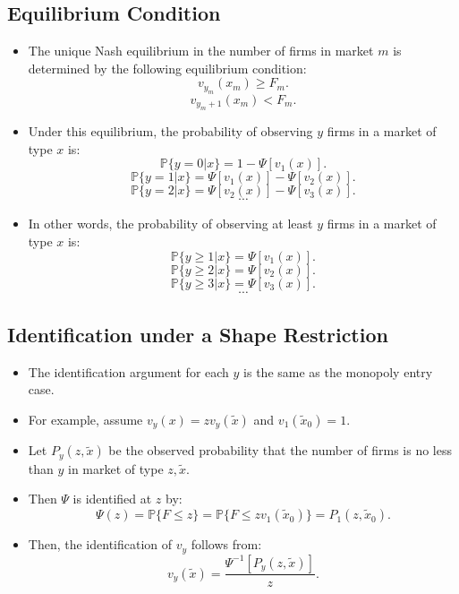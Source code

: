 \documentclass[
]{book}
\providecommand{\tightlist}{%
  \setlength{\itemsep}{0pt}\setlength{\parskip}{0pt}}
\begin{document}
\hypertarget{equilibrium-condition}{%
\subsection{Equilibrium Condition}\label{equilibrium-condition}}

\begin{itemize}
\item
  The unique Nash equilibrium in the number of firms in market \(m\) is determined by the following equilibrium condition:
  \[
  v_{y_m}(x_m) \ge F_m.
  \]
  \[
  v_{y_m + 1}(x_m) < F_m.
  \]
\item
  Under this equilibrium, the probability of observing \(y\) firms in a market of type \(x\) is:
  \[
  \mathbb{P}\{y = 0|x\} = 1 - \Psi[v_1(x)].
  \]
  \[
  \mathbb{P}\{y = 1|x\} = \Psi[v_1(x)] - \Psi[v_2(x)].
  \]
  \[
  \mathbb{P}\{y = 2|x\} = \Psi[v_2(x)] - \Psi[v_3(x)].
  \]
  \[
  \cdots
  \]
\item
  In other words, the probability of observing at least \(y\) firms in a market of type \(x\) is:
  \[
  \mathbb{P}\{y \ge 1|x\} = \Psi[v_1(x)].
  \]
  \[
  \mathbb{P}\{y \ge 2|x\} = \Psi[v_2(x)].
  \]
  \[
  \mathbb{P}\{y \ge 3|x\} = \Psi[v_3(x)].
  \]
  \[
  \cdots
  \]
\end{itemize}

\hypertarget{identification-under-a-shape-restriction}{%
\subsection{Identification under a Shape Restriction}\label{identification-under-a-shape-restriction}}

\begin{itemize}
\tightlist
\item
  The identification argument for each \(y\) is the same as the monopoly entry case.
\item
  For example, assume \(v_y(x) = z v_y(\tilde{x})\) and \(v_1(\tilde{x}_0) = 1\).
\item
  Let \(P_y(z, \tilde{x})\) be the observed probability that the number of firms is no less than \(y\) in market of type \(z, \tilde{x}\).
\item
  Then \(\Psi\) is identified at \(z\) by:
  \[
  \Psi(z) = \mathbb{P}\{F \le z\} = \mathbb{P}\{F \le z v_1(\tilde{x}_0)\} = P_1(z, \tilde{x}_0).
  \]
\item
  Then, the identification of \(v_y\) follows from:
  \[
  v_y(\tilde{x}) = \frac{\Psi^{-1}[P_y(z, \tilde{x})]}{z}.
  \]
\end{itemize}
\end{document}
